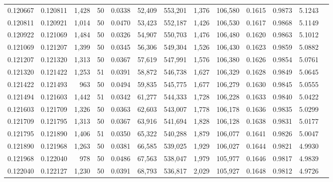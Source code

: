 \begin{tabular}{rrrrrrrrrrrrr}
0.120667 & 0.120811 & 1,428 &  50 &                                     0.0338 &  52,409 & 553,201 &   1,376 & 106,580 & 0.1615 & 0.9873 & 5.1243 \\
0.120811 & 0.120921 & 1,014 &  50 &                                     0.0470 &  53,423 & 552,187 &   1,426 & 106,530 & 0.1617 & 0.9868 & 5.1149 \\
0.120922 & 0.121069 & 1,484 &  50 &                                     0.0326 &  54,907 & 550,703 &   1,476 & 106,480 & 0.1620 & 0.9863 & 5.1012 \\
0.121069 & 0.121207 & 1,399 &  50 &                                     0.0345 &  56,306 & 549,304 &   1,526 & 106,430 & 0.1623 & 0.9859 & 5.0882 \\
0.121207 & 0.121320 & 1,313 &  50 &                                     0.0367 &  57,619 & 547,991 &   1,576 & 106,380 & 0.1626 & 0.9854 & 5.0761 \\
0.121320 & 0.121422 & 1,253 &  51 &                                     0.0391 &  58,872 & 546,738 &   1,627 & 106,329 & 0.1628 & 0.9849 & 5.0645 \\
0.121422 & 0.121493 &   963 &  50 &                                     0.0494 &  59,835 & 545,775 &   1,677 & 106,279 & 0.1630 & 0.9845 & 5.0555 \\
0.121494 & 0.121603 & 1,442 &  51 &                                     0.0342 &  61,277 & 544,333 &   1,728 & 106,228 & 0.1633 & 0.9840 & 5.0422 \\
0.121603 & 0.121709 & 1,326 &  50 &                                     0.0363 &  62,603 & 543,007 &   1,778 & 106,178 & 0.1636 & 0.9835 & 5.0299 \\
0.121709 & 0.121795 & 1,313 &  50 &                                     0.0367 &  63,916 & 541,694 &   1,828 & 106,128 & 0.1638 & 0.9831 & 5.0177 \\
0.121795 & 0.121890 & 1,406 &  51 &                                     0.0350 &  65,322 & 540,288 &   1,879 & 106,077 & 0.1641 & 0.9826 & 5.0047 \\
0.121890 & 0.121968 & 1,263 &  50 &                                     0.0381 &  66,585 & 539,025 &   1,929 & 106,027 & 0.1644 & 0.9821 & 4.9930 \\
0.121968 & 0.122040 &   978 &  50 &                                     0.0486 &  67,563 & 538,047 &   1,979 & 105,977 & 0.1646 & 0.9817 & 4.9839 \\
0.122040 & 0.122127 & 1,230 &  50 &                                     0.0391 &  68,793 & 536,817 &   2,029 & 105,927 & 0.1648 & 0.9812 & 4.9726 \\

\end{tabular}
